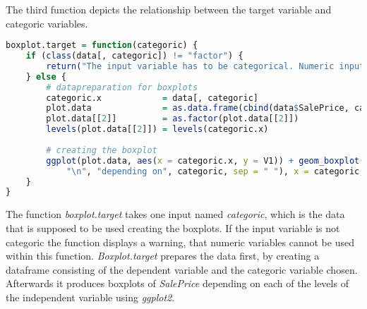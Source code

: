 The third function depicts the relationship between the target variable and categoric variables. 
\begin{lstlisting}[language=R]
boxplot.target = function(categoric) {
    if (class(data[, categoric]) != "factor") {
        return("The input variable has to be categorical. Numeric input does not work!")
    } else {
        # datapreparation for boxplots
        categoric.x            = data[, categoric]
        plot.data              = as.data.frame(cbind(data$SalePrice, categoric.x))
        plot.data[[2]]         = as.factor(plot.data[[2]])
        levels(plot.data[[2]]) = levels(categoric.x)
        
        # creating the boxplot
        ggplot(plot.data, aes(x = categoric.x, y = V1)) + geom_boxplot() + labs(title = paste("Boxplots of SalePrice", 
            "\n", "depending on", categoric, sep = " "), x = categoric, y = "SalePrice") + theme_classic()
    }
}
\end{lstlisting}
The function \textit{boxplot.target} takes one input named \textit{categoric}, which is the data that is supposed to be used creating the boxplots. If the input variable is not categoric the function displays a warning, that numeric variables cannot be used within this function. \textit{Boxplot.target} prepares the data first, by creating a dataframe consisting of the dependent variable and the categoric variable chosen. Afterwards it produces boxplots of \textit{SalePrice} depending on each of the levels of the independent variable using \textit{ggplot2}.